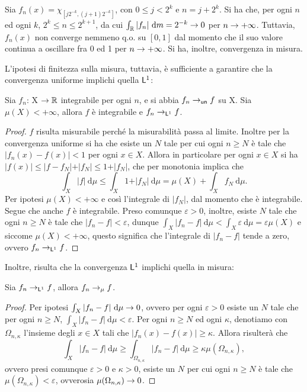 \documentclass[Completo.tex]{subfiles}
\begin{document}
	\begin{Ex}
		Sia $f_n(x) = \chi_{[j2^{-k}, (j+1)2^{-k}]}$, con $0 \leq j < 2^k$ e $n = j + 2^k$. Si ha che, per ogni $n$ ed ogni $k$, $2^k \leq n \leq 2^{k+1}$, da cui $\int_{\bb[R]} \vert f_n \vert \ \mathrm{d}m = 2^{-k} \ra 0$ per $n \rightarrow +\infty$. Tuttavia, $f_n(x)$ non converge nemmeno q.o. su $[0,1]$ dal momento che il suo valore continua a oscillare fra 0 ed 1 per $n \rightarrow +\infty$. Si ha, inoltre, convergenza in misura.
	\end{Ex}
	L'ipotesi di finitezza sulla misura, tuttavia, è sufficiente a garantire che la convergenza uniforme implichi quella $\sf[L]^1$:
	\begin{Th}
		Sia $f_n$: X $\ra \bb[R]$ integrabile per ogni $n$, e si abbia $f_n \ra_{\sf[un]} f$ su X. Sia $\mu(X) < +\infty$, allora $f$ è integrabile e $f_n \ra_{\sf[L]^1} f$.
	\end{Th}
	\begin{proof}
		$f$ risulta misurabile perché la misurabilità passa al limite. Inoltre per la convergenza uniforme si ha che esiste un $N$ tale per cui ogni $n \geq N$ è tale che $\vert f_n(x) - f(x) \vert < 1$ per ogni $x \in X$. Allora in particolare per ogni $x \in X$ si ha $\vert f(x) \vert \leq \vert f - f_N \vert + \vert f_N \vert \leq 1 + \vert f_N \vert$, che per monotonia implica che
		\begin{equation*}
		\int_X \vert f \vert \ \mathrm{d}\mu \leq \int_X 1 + \vert f_N \vert \ \mathrm{d}\mu = \mu(X) + \int_X f_N \ \mathrm{d}\mu.
		\end{equation*}
		Per ipotesi $\mu(X) < +\infty$ e così l'integrale di $\vert f_N \vert$, dal momento che è integrabile. Segue che anche $f$ è integrabile. Preso comunque $\varepsilon > 0$, inoltre, esiste $N$ tale che ogni $n \geq N$ è tale che $\vert f_n - f\vert < \varepsilon$, dunque $\int_X \vert f_n - f \vert \ \mathrm{d}\mu < \int_X \varepsilon \ \mathrm{d}\mu = \varepsilon \mu(X)$ e siccome $\mu(X) < +\infty$, questo significa che l'integrale di $\vert f_n - f \vert$ tende a zero, ovvero $f_n \ra_{\sf[L]^1} f$.
	\end{proof}
	Inoltre, risulta che la convergenza $\sf[L]^1$ implichi quella in misura:
	\begin{eTh}
		Sia $f_n \ra_{\sf[L]^1} f$, allora $f_n \rightarrow_{\mu} f$.
	\end{eTh}
	\begin{proof}
		Per ipotesi $\int_X \vert f_n - f \vert \ \mathrm{d}\mu \rightarrow 0$, ovvero per ogni $\varepsilon > 0$ esiste un $N$ tale che per ogni $n \geq N$, $\int_X \vert f_n - f \vert \ \mathrm{d}\mu < \varepsilon$. Per ogni $n \geq N$ ed ogni $\kappa$, denotiamo con $\Omega_{n, \kappa}$ l'insieme degli $x \in X$ tali che $\vert f_n(x) - f(x) \vert \geq \kappa$. Allora risulterà che 
		\begin{equation*}
		\int_X \vert f_n - f \vert \ \mathrm{d}\mu \geq \int_{\Omega_{n, \kappa}} \vert f_n - f \vert \ \mathrm{d}\mu \geq \kappa \mu(\Omega_{n, \kappa}),
		\end{equation*}
		ovvero presi comunque $\varepsilon > 0$ e $\kappa > 0$, esiste un $N$ per cui ogni $n \geq N$ è tale che $\mu(\Omega_{n, \kappa}) < \varepsilon$, ovverosia $\mu(\Omega_{n, \kappa}) \rightarrow 0$.
	\end{proof}
\end{document}
